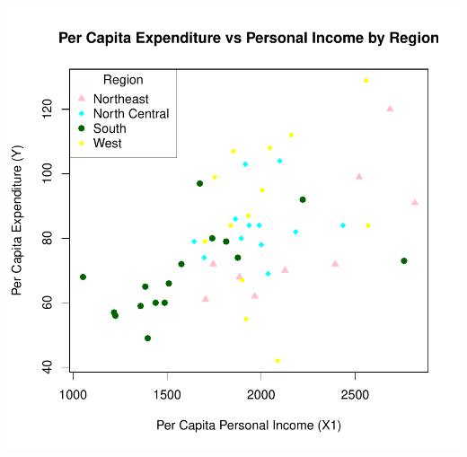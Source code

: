 \documentclass[12pt,letterpaper]{article}
\begin{document}
\begin{itemize}
{\centering
\includegraphics[width=\textwidth]{Question2.3.pdf}\par}
\end{itemize}
\end{document}
